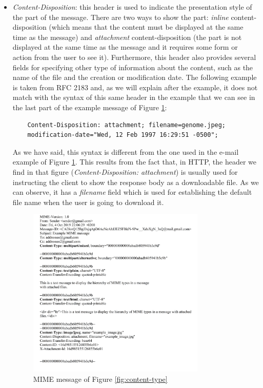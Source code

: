 \begin{itemize}
	\item\textit{Content-Disposition}: this header is used to indicate the presentation style of the part of the message. There are two ways to show the part: \textit{inline} content-disposition (which means that the content must be displayed at the same time as the message) and \textit{attachment} content-disposition (the part is not displayed at the same time as the message and it requires some form or action from the user to see it). Furthermore, this header also provides several fields for specifying other type of information about the content, such as the name of the file and the creation or modification date. The following example is taken from RFC 2183 \citep{rfc2183} and, as we will explain after the example, it does not match with the syntax of this same header in the example that we can see in the last part of the example message of Figure \ref{fig:examplemime}:
	\begin{lstlisting}
	Content-Disposition: attachment; filename=genome.jpeg;
	modification-date="Wed, 12 Feb 1997 16:29:51 -0500";
	\end{lstlisting}
	As we have said, this syntax is different from the one used in the e-mail example of Figure \ref{fig:examplemime}. This results from the fact that, in HTTP, the header we find in that figure (\textit{Content-Disposition: attachment}) is usually used for instructing the client to show the response body as a downloadable file. As we can observe, it has a \textit{filename} field which is used for establishing the default file name when the user is going to download it.
	
	\begin{figure}[t]
		\centering%
		\centerline{\includegraphics[width = 0.8\textwidth]{Imagenes/Bitmap/exampleMime.png}}%
		\caption{MIME message of Figure \ref{fig:content-type}}%
		\label{fig:examplemime}
	\end{figure}
	

\end{itemize}
